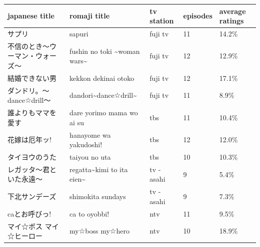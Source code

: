 \documentclass{article}
\begin{document}
\begin{tabular}{lllll}
\toprule
japanese title & romaji title & tv station & episodes & average ratings \\
\midrule
サプリ & sapuri & fuji tv & 11 & 14.2\% \\
不信のとき～ウーマン・ウォーズ～ & fushin no toki \textasciitilde{}woman wars\textasciitilde{} & fuji tv & 12 & 12.9\% \\
結婚できない男 & kekkon dekinai otoko & fuji tv & 12 & 17.1\% \\
ダンドリ。～dance☆drill～ & dandori\textasciitilde{}dance☆drill\textasciitilde{} & fuji tv & 11 & 8.9\% \\
誰よりもママを愛す & dare yorimo mama wo ai su & tbs & 11 & 10.4\% \\
花嫁は厄年ッ! & hanayome wa yakudoshi! & tbs & 12 & 12.0\% \\
タイヨウのうた & taiyou no uta & tbs & 10 & 10.3\% \\
レガッタ～君といた永遠～ & regatta\textasciitilde{}kimi to ita eien\textasciitilde{} & tv - asahi & 9 & 5.4\% \\
下北サンデーズ & shimokita sundays & tv - asahi & 9 & 7.3\% \\
caとお呼びっ! & ca to oyobbi! & ntv & 11 & 9.5\% \\
マイ☆ボス マイ☆ヒーロー & my☆boss my☆hero & ntv & 10 & 18.9\% \\
\bottomrule
\end{tabular}
\end{document}
